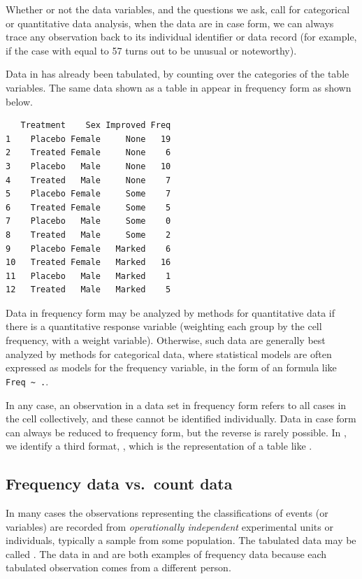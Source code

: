 \documentclass[10pt,krantz2]{krantz}\usepackage[]{graphicx}\usepackage[]{color}
\makeatletter
\newenvironment{kframe}{%
 \def\at@end@of@kframe{}%
 \ifinner\ifhmode%
  \def\at@end@of@kframe{\end{minipage}}%
  \begin{minipage}{\columnwidth}%
 \fi\fi%
 \def\FrameCommand##1{\hskip\@totalleftmargin \hskip-\fboxsep
 \colorbox{shadecolor}{##1}\hskip-\fboxsep
     \hskip-\linewidth \hskip-\@totalleftmargin \hskip\columnwidth}%
 \MakeFramed {\advance\hsize-\width
   \@totalleftmargin\z@ \linewidth\hsize
   \@setminipage}}%
 {\par\unskip\endMakeFramed%
 \at@end@of@kframe}
\newenvironment{knitrout}{}{} %
\renewenvironment{knitrout}{\small\renewcommand{\baselinestretch}{.85}}{} %
\makeatother
\begin{document}
Whether or not the data variables, and the questions we ask, call for
categorical or quantitative data analysis,
when the data are in case form,
we can always trace
any observation back to its individual identifier or data record
(for example, if the case with  equal to 57 turns out to be unusual
or noteworthy).

Data in 
has already been tabulated, by counting over the categories of the
table variables. The same data shown as a table in
 appear in frequency form as shown below.
\begin{knitrout}
\color{fgcolor}\begin{kframe}
\begin{verbatim}
   Treatment    Sex Improved Freq
1    Placebo Female     None   19
2    Treated Female     None    6
3    Placebo   Male     None   10
4    Treated   Male     None    7
5    Placebo Female     Some    7
6    Treated Female     Some    5
7    Placebo   Male     Some    0
8    Treated   Male     Some    2
9    Placebo Female   Marked    6
10   Treated Female   Marked   16
11   Placebo   Male   Marked    1
12   Treated   Male   Marked    5
\end{verbatim}
\end{kframe}
\end{knitrout}

Data in frequency form may be analyzed by methods
for quantitative data if there is a quantitative response variable
(weighting each group by the cell frequency, with a weight
variable).
Otherwise, such data are generally
best analyzed by methods for categorical data, where
statistical models are often expressed as models for the
frequency variable, in the form of an \R formula
like \verb|Freq ~ .|.

In any case, an observation in a data set in
frequency form refers
to all cases in the cell collectively, and these cannot be identified individually.
Data in case form can always be reduced to frequency form,
but the reverse is rarely possible. In ,
we identify a third format, , which is the
\R representation of a table like .

\subsection{Frequency data vs.\ count data}\label{sec:freq-count}
In many cases the observations representing the classifications of events (or variables) are
recorded from \emph{operationally independent} experimental units or individuals, typically
a sample from some population.  The tabulated data may be called
.  The data in  and 
are both examples of frequency data because each tabulated observation 
comes from a different person.
\end{document}

